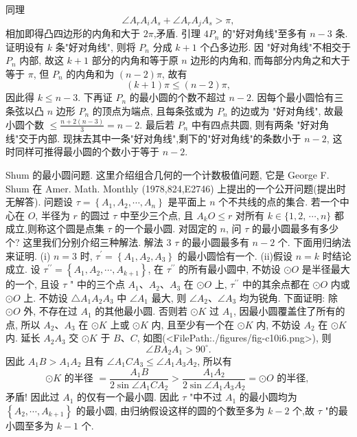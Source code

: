 同理
$$
\angle A_r A_i A_s+\angle A_r A_j A_s>\pi,
$$
相加即得凸四边形的内角和大于 $2 \pi$,矛盾.
引理 $4 P_n$ 的"好对角线"至多有 $n-3$ 条.
证明设有 $k$ 条"好对角线", 则将 $P_n$ 分成 $k+1$ 个凸多边形.
因 "好对角线"不相交于 $P_n$ 内部, 故这 $k+1$ 部分的内角和等于原 $n$ 边形的内角和, 而每部分内角之和大于等于 $\pi$, 但 $P_n$ 的内角和为 $(n-2) \pi$, 故有
$$
(k+1) \pi \leqslant(n-2) \pi,
$$
因此得 $k \leqslant n-3$.
下再证 $P_n$ 的最小圆的个数不超过 $n-2$.
因每个最小圆恰有三条弦以凸 $n$ 边形 $P_n$ 的顶点为端点, 且每条弦或为 $P_n$ 的边或为 "好对角线", 故最小圆个数 $\leqslant \frac{n+2(n-3)}{3}=n-2$.
最后若 $P_n$ 中有四点共圆, 则有两条 "好对角线"交于内部.
现抹去其中一条"好对角线",剩下的"好对角线"的条数小于 $n-2$, 这时同样可推得最小圆的个数小于等于 $n-2$.



Shum 的最小圆问题.
这里介绍组合几何的一个计数极值问题, 它是 George F. Shum 在 Amer. Math. Monthly (1978,824,E2746) 上提出的一个公开问题(提出时无解答).
问题设 $\tau=\left\{A_1, A_2, \cdots, A_n\right\}$ 是平面上 $n$ 个不共线的点的集合.
若一个中心在 $O$, 半径为 $r$ 的圆过 $\tau$ 中至少三个点, 且 $A_k O \leqslant r$ 对所有 $k \in\{1,2$, $\cdots, n\}$ 都成立,则称这个圆是点集 $\tau$ 的一个最小圆.
对固定的 $n$, 问 $\tau$ 的最小圆最多有多少个?
这里我们分别介绍三种解法.
解法 3 $\tau$ 的最小圆最多有 $n-2$ 个.
下面用归纳法来证明.
(i) $n=3$ 时, $\tau^{\prime}=\left\{A_1, A_2, A_3\right\}$ 的最小圆恰有一个.
(ii)假设 $n=k$ 时结论成立.
设 $\tau^{\prime \prime}=\left\{A_1, A_2, \cdots, A_{k+1}\right\}$, 在 $\tau^{\prime \prime}$ 的所有最小圆中, 不妨设 $\odot O$ 是半径最大的一个, 且设 $\tau$ " 中的三个点 $A_1 、 A_2 、 A_3$ 在 $\odot O$ 上, $\tau^{\prime \prime}$ 中的其余点都在 $\odot O$ 内或 $\odot O$ 上.
不妨设 $\triangle A_1 A_2 A_3$ 中 $\angle A_1$ 最大, 则 $\angle A_2 、 \angle A_3$ 均为锐角.
下面证明: 除 $\odot O$ 外, 不存在过 $A_1$ 的其他最小圆.
否则若 $\odot K$ 过 $A_1$, 因最小圆覆盖住了所有的点, 所以 $A_2 、 A_3$ 在 $\odot K$ 上或 $\odot K$ 内, 且至少有一个在 $\odot K$ 内, 不妨设 $A_2$ 在 $\odot K$ 内.
延长 $A_2 A_3$ 交 $\odot K$ 于 $B 、 C$, 如图(<FilePath:./figures/fig-c10i6.png>), 则
$$
\angle B A_2 A_1>90^{\circ} .
$$
因此 $A_1 B>A_1 A_2$ 且有 $\angle A_1 C A_3 \leqslant \angle A_1 A_3 A_2$, 所以有
$$
\odot K \text { 的半径 }=\frac{A_1 B}{2 \sin \angle A_1 C A_2}>\frac{A_1 A_2}{2 \sin \angle A_1 A_3 A_2}=\odot O \text { 的半径, }
$$
矛盾! 因此过 $A_1$ 的仅有一个最小圆.
因此 $\tau$ "中不过 $A_1$ 的最小圆均为 $\left\{A_2, \cdots, A_{k+1}\right\}$ 的最小圆, 由归纳假设这样的圆的个数至多为 $k-2$ 个,故 $\tau$ "的最小圆至多为 $k-1$ 个.
